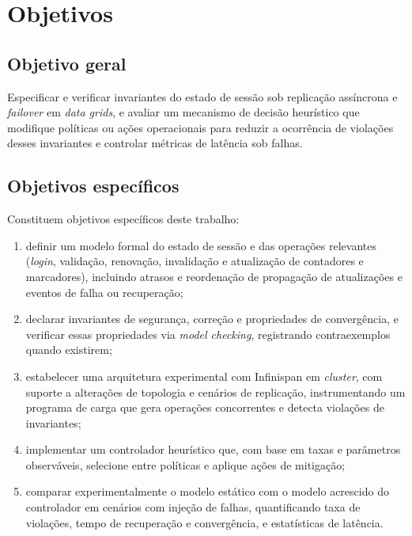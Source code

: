 \section{Objetivos}
\label{sec-objetivos}

\subsection*{Objetivo geral}
\label{sec-objetivo-geral}

Especificar e verificar invariantes do estado de sessão sob replicação assíncrona e \emph{failover} em \emph{data grids}, e avaliar um mecanismo de decisão heurístico que modifique políticas ou ações operacionais para reduzir a ocorrência de violações desses invariantes e controlar métricas de latência sob falhas.

\subsection*{Objetivos específicos}
\label{sec-objetivos-especificos}

Constituem objetivos específicos deste trabalho:

\begin{enumerate}[label=(\arabic*)]
    \item definir um modelo formal do estado de sessão e das operações relevantes (\emph{login}, validação, renovação, invalidação e atualização de contadores e marcadores), incluindo atrasos e reordenação de propagação de atualizações e eventos de falha ou recuperação;
    \item declarar invariantes de segurança, correção e propriedades de convergência, e verificar essas propriedades via \emph{model checking}, registrando contraexemplos quando existirem;
    \item estabelecer uma arquitetura experimental com Infinispan em \emph{cluster}, com suporte a alterações de topologia e cenários de replicação, instrumentando um programa de carga que gera operações concorrentes e detecta violações de invariantes;
    \item implementar um controlador heurístico que, com base em taxas e parâmetros observáveis, selecione entre políticas e aplique ações de mitigação;
    \item comparar experimentalmente o modelo estático com o modelo acrescido do controlador em cenários com injeção de falhas, quantificando taxa de violações, tempo de recuperação e convergência, e estatísticas de latência.
\end{enumerate}



